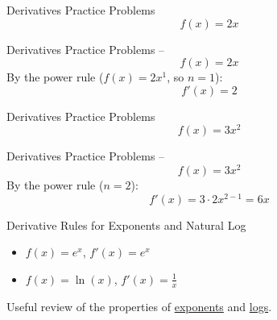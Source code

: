 \documentclass[aspectratio=169]{beamer}
\begin{document}
\begin{frame}{Derivatives Practice Problems}\label{main1}
	\vspace{-4cm}
     \[
    f(x) = 2x
    \]
\end{frame}

\begin{frame}{Derivatives Practice Problems -- }\label{main1}
	\vspace{-1cm}
     \[
    f(x) = 2x
    \]
    \vspace{0.5em}
    By the power rule ($f(x)=2x^1$, so $n=1$):
    \[
    f'(x) = 2
    \]
\end{frame}

\begin{frame}{Derivatives Practice Problems}\label{main1}
	\vspace{-4cm}
     \[
    f(x) = 3x^2
    \]
\end{frame}

\begin{frame}{Derivatives Practice Problems -- }\label{main1}
	\vspace{-1cm}
     \[
    f(x) = 3x^2
    \]
    \vspace{0.5em}
    By the power rule ($n=2$):
    \[
    f'(x) = 3 \cdot 2x^{2-1} = 6x
    \]
\end{frame}

\begin{frame}{Derivative Rules for Exponents and Natural Log}\label{main1}
\begin{itemize}
\begin{itemize}
    \item \(f(x) = e^x\), \(f'(x) = e^x\)
    \item \(f(x) = \ln(x)\), \(f'(x) = \frac{1}{x}\)
\end{itemize}
\end{itemize}
\bigskip
Useful review of the properties of \hyperlink{exponentslide}{exponents} and \hyperlink{naturallogslide}{logs}.
\end{frame}
\end{document}
